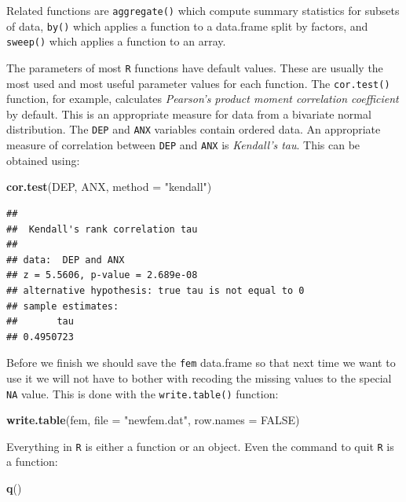 \documentclass[12pt,]{book}
\newenvironment{Shaded}{\begin{snugshade}}{\end{snugshade}}
\newcommand{\KeywordTok}[1]{\textcolor[rgb]{0.13,0.29,0.53}{\textbf{#1}}}
\newcommand{\DataTypeTok}[1]{\textcolor[rgb]{0.13,0.29,0.53}{#1}}
\newcommand{\StringTok}[1]{\textcolor[rgb]{0.31,0.60,0.02}{#1}}
\newcommand{\OtherTok}[1]{\textcolor[rgb]{0.56,0.35,0.01}{#1}}
\newcommand{\NormalTok}[1]{#1}
\theoremstyle{definition}
\theoremstyle{definition}
\theoremstyle{definition}
\theoremstyle{remark}
\begin{document}
Related functions are \texttt{aggregate()} which compute summary
statistics for subsets of data, \texttt{by()} which applies a function
to a data.frame split by factors, and \texttt{sweep()} which applies a
function to an array.

The parameters of most \texttt{R} functions have default values. These
are usually the most used and most useful parameter values for each
function. The \texttt{cor.test()} function, for example, calculates
\emph{Pearson's product moment correlation coefficient} by default. This
is an appropriate measure for data from a bivariate normal distribution.
The \texttt{DEP} and \texttt{ANX} variables contain ordered data. An
appropriate measure of correlation between \texttt{DEP} and \texttt{ANX}
is \emph{Kendall's tau}. This can be obtained using:

\begin{Shaded}
\begin{Highlighting}[]
\KeywordTok{cor.test}\NormalTok{(DEP, ANX, }\DataTypeTok{method =} \StringTok{"kendall"}\NormalTok{)}
\end{Highlighting}
\end{Shaded}

\begin{verbatim}
## 
##  Kendall's rank correlation tau
## 
## data:  DEP and ANX
## z = 5.5606, p-value = 2.689e-08
## alternative hypothesis: true tau is not equal to 0
## sample estimates:
##       tau 
## 0.4950723
\end{verbatim}

Before we finish we should save the \texttt{fem} data.frame so that next
time we want to use it we will not have to bother with recoding the
missing values to the special \texttt{NA} value. This is done with the
\texttt{write.table()} function:

\begin{Shaded}
\begin{Highlighting}[]
\KeywordTok{write.table}\NormalTok{(fem, }\DataTypeTok{file =} \StringTok{"newfem.dat"}\NormalTok{, }\DataTypeTok{row.names =} \OtherTok{FALSE}\NormalTok{)}
\end{Highlighting}
\end{Shaded}

Everything in \texttt{R} is either a function or an object. Even the
command to quit \texttt{R} is a function:

\begin{Shaded}
\begin{Highlighting}[]
\KeywordTok{q}\NormalTok{()}
\end{Highlighting}
\end{Shaded}
\end{document}
